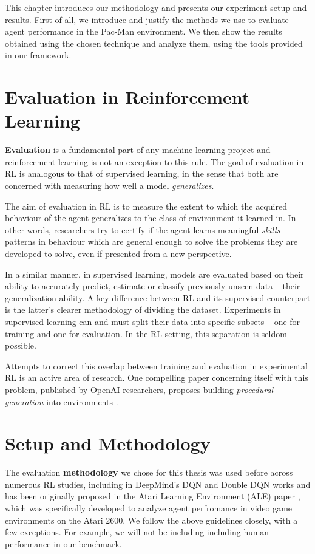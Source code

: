 This chapter introduces our methodology and presents our experiment setup and results.
First of all, we introduce and justify the methods we use to evaluate agent performance in the Pac-Man environment.
We then show the results obtained using the chosen technique and analyze them, using the tools provided in our framework.

\section{Evaluation in Reinforcement Learning}
\textbf{Evaluation} is a fundamental part of any machine learning project and reinforcement learning is not an exception to this rule.
The goal of evaluation in RL is analogous to that of supervised learning, in the sense that both are concerned with measuring how well a model \emph{generalizes}.

The aim of evaluation in RL is to measure the extent to which the acquired behaviour of the agent generalizes to the class of environment it learned in.
In other words, researchers try to certify if the agent learns meaningful \emph{skills} -- patterns in behaviour which are general enough to solve the problems they are developed to solve, even if presented from a new perspective.

In a similar manner, in supervised learning, models are evaluated based on their ability to accurately predict, estimate or classify previously unseen data -- their generalization ability.
A key difference between RL and its supervised counterpart is the latter's clearer methodology of dividing the dataset.
Experiments in supervised learning can and must split their data into specific subsets -- one for training and one for evaluation. In the RL setting, this separation is seldom possible.

Attempts to correct this overlap between training and evaluation in experimental RL is an active area of research.
One compelling paper concerning itself with this problem, published by OpenAI researchers, proposes building \emph{procedural generation} into environments \cite{procgen-paper}.

\section{Setup and Methodology}
The evaluation \textbf{methodology} we chose for this thesis was used before across numerous RL studies, including in DeepMind's DQN and Double DQN works \cite{atari-dqn,ddqn-paper} and has been originally proposed in the Atari Learning Environment (ALE) paper \cite{ale-paper}, which was specifically developed to analyze agent perfromance in video game environments on the Atari 2600.
We follow the above guidelines closely, with a few exceptions.
For example, we will not be including including human performance in our benchmark.

